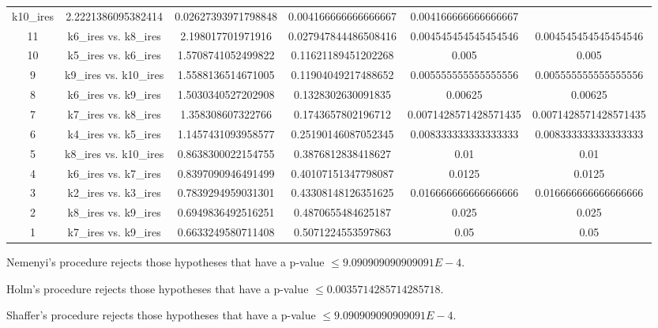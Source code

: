 \documentclass[a4paper,10pt]{article}
\begin{document}
\begin{landscape}
\begin{table}[!htp]
\begin{tabular}{cccccc}
k10_ires&2.2221386095382414&0.02627393971798848&0.004166666666666667&0.004166666666666667\\11&k6_ires vs. k8_ires&2.198017701971916&0.027947844486508416&0.004545454545454546&0.004545454545454546\\10&k5_ires vs. k6_ires&1.5708741052499822&0.11621189451202268&0.005&0.005\\9&k9_ires vs. k10_ires&1.5588136514671005&0.11904049217488652&0.005555555555555556&0.005555555555555556\\8&k6_ires vs. k9_ires&1.5030340527202908&0.1328302630091835&0.00625&0.00625\\7&k7_ires vs. k8_ires&1.358308607322766&0.1743657802196712&0.0071428571428571435&0.0071428571428571435\\6&k4_ires vs. k5_ires&1.1457431093958577&0.25190146087052345&0.008333333333333333&0.008333333333333333\\5&k8_ires vs. k10_ires&0.8638300022154755&0.3876812838418627&0.01&0.01\\4&k6_ires vs. k7_ires&0.8397090946491499&0.40107151347798087&0.0125&0.0125\\3&k2_ires vs. k3_ires&0.7839294959031301&0.43308148126351625&0.016666666666666666&0.016666666666666666\\2&k8_ires vs. k9_ires&0.6949836492516251&0.4870655484625187&0.025&0.025\\1&k7_ires vs. k9_ires&0.6633249580711408&0.5071224553597863&0.05&0.05\\\hline
\end{tabular}
\end{table}
Nemenyi's procedure rejects those hypotheses that have a p-value $\le9.090909090909091E-4$.


Holm's procedure rejects those hypotheses that have a p-value $\le0.0035714285714285718$.


Shaffer's procedure rejects those hypotheses that have a p-value $\le9.090909090909091E-4$.



\end{landscape}
\end{document}
